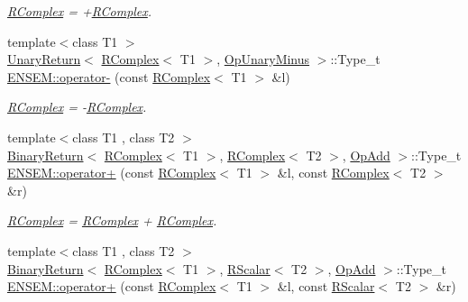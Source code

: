 \begin{DoxyCompactItemize}
\begin{DoxyCompactList}\small\item\em \mbox{\hyperlink{classENSEM_1_1RComplex}{R\+Complex}} = +\mbox{\hyperlink{classENSEM_1_1RComplex}{R\+Complex}}. \end{DoxyCompactList}\item 
{\footnotesize template$<$class T1 $>$ }\\\mbox{\hyperlink{structENSEM_1_1UnaryReturn}{Unary\+Return}}$<$ \mbox{\hyperlink{classENSEM_1_1RComplex}{R\+Complex}}$<$ T1 $>$, \mbox{\hyperlink{structENSEM_1_1OpUnaryMinus}{Op\+Unary\+Minus}} $>$\+::Type\+\_\+t \mbox{\hyperlink{group__rcomplex_ga1b707b6c08424743d1f21d7162f4553b}{E\+N\+S\+E\+M\+::operator-\/}} (const \mbox{\hyperlink{classENSEM_1_1RComplex}{R\+Complex}}$<$ T1 $>$ \&l)
\begin{DoxyCompactList}\small\item\em \mbox{\hyperlink{classENSEM_1_1RComplex}{R\+Complex}} = -\/\mbox{\hyperlink{classENSEM_1_1RComplex}{R\+Complex}}. \end{DoxyCompactList}\item 
{\footnotesize template$<$class T1 , class T2 $>$ }\\\mbox{\hyperlink{structENSEM_1_1BinaryReturn}{Binary\+Return}}$<$ \mbox{\hyperlink{classENSEM_1_1RComplex}{R\+Complex}}$<$ T1 $>$, \mbox{\hyperlink{classENSEM_1_1RComplex}{R\+Complex}}$<$ T2 $>$, \mbox{\hyperlink{structENSEM_1_1OpAdd}{Op\+Add}} $>$\+::Type\+\_\+t \mbox{\hyperlink{group__rcomplex_ga4d7e8b93db619c9854c1e6fa23a3a454}{E\+N\+S\+E\+M\+::operator+}} (const \mbox{\hyperlink{classENSEM_1_1RComplex}{R\+Complex}}$<$ T1 $>$ \&l, const \mbox{\hyperlink{classENSEM_1_1RComplex}{R\+Complex}}$<$ T2 $>$ \&r)
\begin{DoxyCompactList}\small\item\em \mbox{\hyperlink{classENSEM_1_1RComplex}{R\+Complex}} = \mbox{\hyperlink{classENSEM_1_1RComplex}{R\+Complex}} + \mbox{\hyperlink{classENSEM_1_1RComplex}{R\+Complex}}. \end{DoxyCompactList}\item 
{\footnotesize template$<$class T1 , class T2 $>$ }\\\mbox{\hyperlink{structENSEM_1_1BinaryReturn}{Binary\+Return}}$<$ \mbox{\hyperlink{classENSEM_1_1RComplex}{R\+Complex}}$<$ T1 $>$, \mbox{\hyperlink{classENSEM_1_1RScalar}{R\+Scalar}}$<$ T2 $>$, \mbox{\hyperlink{structENSEM_1_1OpAdd}{Op\+Add}} $>$\+::Type\+\_\+t \mbox{\hyperlink{group__rcomplex_gacf34d655d02ee81a131842116e13d950}{E\+N\+S\+E\+M\+::operator+}} (const \mbox{\hyperlink{classENSEM_1_1RComplex}{R\+Complex}}$<$ T1 $>$ \&l, const \mbox{\hyperlink{classENSEM_1_1RScalar}{R\+Scalar}}$<$ T2 $>$ \&r)

\end{DoxyCompactItemize}
